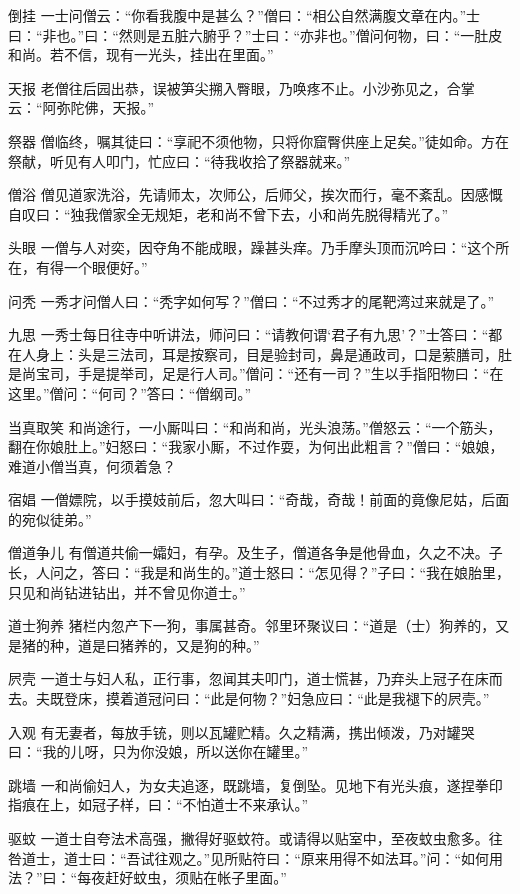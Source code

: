 \documentclass[12pt,UTF8]{ctexbook}
\begin{document}
倒挂
一士问僧云：“你看我腹中是甚么？”僧曰：“相公自然满腹文章在内。”士曰：“非也。”曰：“然则是五脏六腑乎？”士曰：“亦非也。”僧问何物，曰：“一肚皮和尚。若不信，现有一光头，挂出在里面。”

天报
老僧往后园出恭，误被笋尖搠入臀眼，乃唤疼不止。小沙弥见之，合掌云：“阿弥陀佛，天报。”

祭器
僧临终，嘱其徒曰：“享祀不须他物，只将你窟臀供座上足矣。”徒如命。方在祭献，听见有人叩门，忙应曰：“待我收拾了祭器就来。”

僧浴
僧见道家洗浴，先请师太，次师公，后师父，挨次而行，毫不紊乱。因感慨自叹曰：“独我僧家全无规矩，老和尚不曾下去，小和尚先脱得精光了。”

头眼
一僧与人对奕，因夺角不能成眼，躁甚头痒。乃手摩头顶而沉吟曰：“这个所在，有得一个眼便好。”

问秃
一秀才问僧人曰：“秃字如何写？”僧曰：“不过秀才的尾靶湾过来就是了。”

九思
一秀士每日往寺中听讲法，师问曰：“请教何谓‘君子有九思’？”士答曰：“都在人身上：头是三法司，耳是按察司，目是验封司，鼻是通政司，口是萦膳司，肚是尚宝司，手是提举司，足是行人司。”僧问：“还有一司？”生以手指阳物曰：“在这里。”僧问：“何司？”答曰：“僧纲司。”

当真取笑
和尚途行，一小厮叫曰：“和尚和尚，光头浪荡。”僧怒云：“一个筋头，翻在你娘肚上。”妇怒曰：“我家小厮，不过作耍，为何出此粗言？”僧曰：“娘娘，难道小僧当真，何须着急？

宿娼
一僧嫖院，以手摸妓前后，忽大叫曰：“奇哉，奇哉！前面的竟像尼姑，后面的宛似徒弟。”

僧道争儿
有僧道共偷一孀妇，有孕。及生子，僧道各争是他骨血，久之不决。子长，人问之，答曰：“我是和尚生的。”道士怒曰：“怎见得？”子曰：“我在娘胎里，只见和尚钻进钻出，并不曾见你道士。”

道士狗养
猪栏内忽产下一狗，事属甚奇。邻里环聚议曰：“道是（士）狗养的，又是猪的种，道是曰猪养的，又是狗的种。”

屄壳
一道士与妇人私，正行事，忽闻其夫叩门，道士慌甚，乃弃头上冠子在床而去。夫既登床，摸着道冠问曰：“此是何物？”妇急应曰：“此是我褪下的屄壳。”

入观
有无妻者，每放手铳，则以瓦罐贮精。久之精满，携出倾泼，乃对罐哭曰：“我的儿呀，只为你没娘，所以送你在罐里。”

跳墙
一和尚偷妇人，为女夫追逐，既跳墙，复倒坠。见地下有光头痕，遂捏拳印指痕在上，如冠子样，曰：“不怕道士不来承认。”

驱蚊
一道士自夸法术高强，撇得好驱蚊符。或请得以贴室中，至夜蚊虫愈多。往咎道士，道士曰：“吾试往观之。”见所贴符曰：“原来用得不如法耳。”问：“如何用法？”曰：“每夜赶好蚊虫，须贴在帐子里面。”
\end{document}
